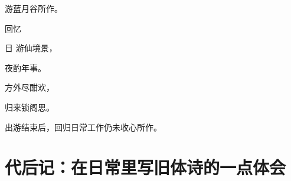 \documentclass{article}
\newenvironment{poem}[3]{
\begin{minipage}{\textwidth}
\begin{pinyinscope}\begin{center}\Large\linespread{1.4}\selectfont #2\end{center}\end{pinyinscope}
\begin{pinyinscope}
	\begin{center}
	\Large\linespread{1.4}\rmfamily\selectfont #3
}{\end{center}
\end{pinyinscope}
\end{minipage}
}
\begin{document}
游蓝月谷所作。

\bigbreak


\begin{poem}{}{回忆}
日游仙境景，

夜酌{}年事。

方外尽酣欢，

归来锁阁思。
\end{poem}

出游结束后，回归日常工作仍未收心所作。





















\section{代后记：在日常里写旧体诗的一点体会}
\end{document}
